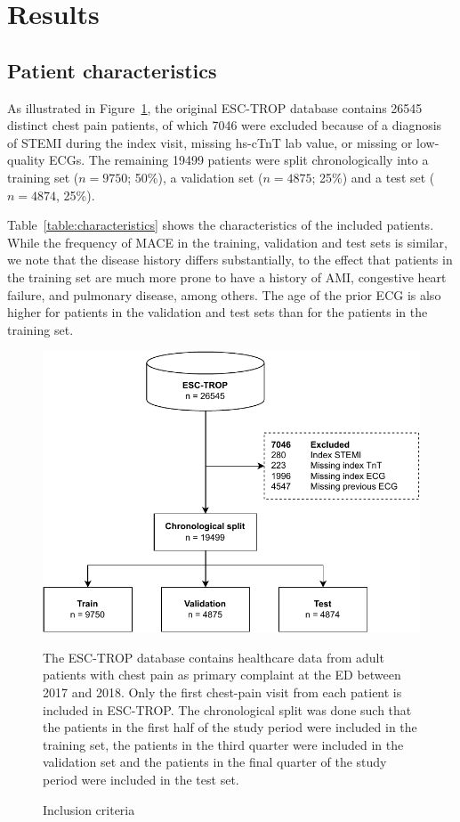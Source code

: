 \documentclass[preprint]{elsarticle}
\begin{document}
\section{Results}
\subsection{Patient characteristics}
\label{sec:patient_characteristics}
As illustrated in Figure~\ref{fig:inclusion}, the original ESC-TROP database contains 26545 distinct chest pain patients, of which 7046 were excluded because of a diagnosis of STEMI during the index visit, missing hs-cTnT lab value, or missing or low-quality ECGs. The remaining 19499 patients were split chronologically into a training set ($n=9750$; 50\%), a validation set ($n=4875$; 25\%) and a test set ($n=4874$, 25\%).

Table~\ref{table:characteristics} shows the characteristics of the included patients. While the frequency of MACE in the training, validation and test sets is similar, we note that the disease history differs substantially, to the effect that patients in the training set are much more prone to have a history of AMI, congestive heart failure, and pulmonary disease, among others. The age of the prior ECG is also higher for patients in the validation and test sets than for the patients in the training set.

\begin{figure}[h!]
\includegraphics[width=\linewidth]{inclusioncriteria-crop.pdf}
\centering
\caption{Inclusion criteria}
\medskip
\small
The ESC-TROP database contains healthcare data from adult patients with chest pain as primary complaint at the ED between 2017 and 2018. Only the first chest-pain visit from each patient is included in ESC-TROP. The chronological split was done such that the patients in the first half of the study period were included in the training set, the patients in the third quarter were included in the validation set and the patients in the final quarter of the study period were included in the test set. 
\label{fig:inclusion}
\end{figure}
\end{document}
